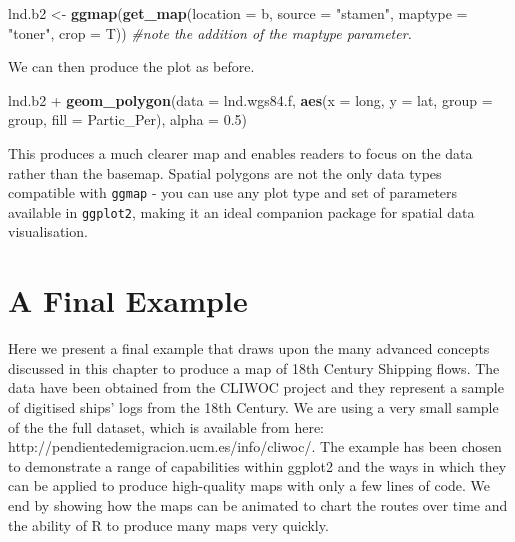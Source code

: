 \documentclass[]{article}
\newenvironment{Shaded}{}{}
\newcommand{\KeywordTok}[1]{\textcolor[rgb]{0.00,0.44,0.13}{\textbf{{#1}}}}
\newcommand{\DataTypeTok}[1]{\textcolor[rgb]{0.56,0.13,0.00}{{#1}}}
\newcommand{\FloatTok}[1]{\textcolor[rgb]{0.25,0.63,0.44}{{#1}}}
\newcommand{\StringTok}[1]{\textcolor[rgb]{0.25,0.44,0.63}{{#1}}}
\newcommand{\CommentTok}[1]{\textcolor[rgb]{0.38,0.63,0.69}{\textit{{#1}}}}
\newcommand{\NormalTok}[1]{{#1}}
\begin{document}
\begin{Shaded}
\begin{Highlighting}[]
\NormalTok{lnd.b2 <- }\KeywordTok{ggmap}\NormalTok{(}\KeywordTok{get_map}\NormalTok{(}\DataTypeTok{location =} \NormalTok{b, }\DataTypeTok{source =} \StringTok{"stamen"}\NormalTok{, }\DataTypeTok{maptype =} \StringTok{"toner"}\NormalTok{, }
    \DataTypeTok{crop =} \NormalTok{T))  }\CommentTok{#note the addition of the maptype parameter.}
\end{Highlighting}
\end{Shaded}

We can then produce the plot as before.

\begin{Shaded}
\begin{Highlighting}[]
\NormalTok{lnd.b2 + }\KeywordTok{geom_polygon}\NormalTok{(}\DataTypeTok{data =} \NormalTok{lnd.wgs84.f, }\KeywordTok{aes}\NormalTok{(}\DataTypeTok{x =} \NormalTok{long, }\DataTypeTok{y =} \NormalTok{lat, }\DataTypeTok{group =} \NormalTok{group, }
    \DataTypeTok{fill =} \NormalTok{Partic_Per), }\DataTypeTok{alpha =} \FloatTok{0.5}\NormalTok{)}
\end{Highlighting}
\end{Shaded}

This produces a much clearer map and enables readers to focus on the
data rather than the basemap. Spatial polygons are not the only data
types compatible with \texttt{ggmap} - you can use any plot type and set
of parameters available in \texttt{ggplot2}, making it an ideal
companion package for spatial data visualisation.

\section{A Final Example}

Here we present a final example that draws upon the many advanced
concepts discussed in this chapter to produce a map of 18th Century
Shipping flows. The data have been obtained from the CLIWOC project and
they represent a sample of digitised ships' logs from the 18th Century.
We are using a very small sample of the the full dataset, which is
available from here: http://pendientedemigracion.ucm.es/info/cliwoc/.
The example has been chosen to demonstrate a range of capabilities
within ggplot2 and the ways in which they can be applied to produce
high-quality maps with only a few lines of code. We end by showing how
the maps can be animated to chart the routes over time and the ability
of R to produce many maps very quickly.
\end{document}
